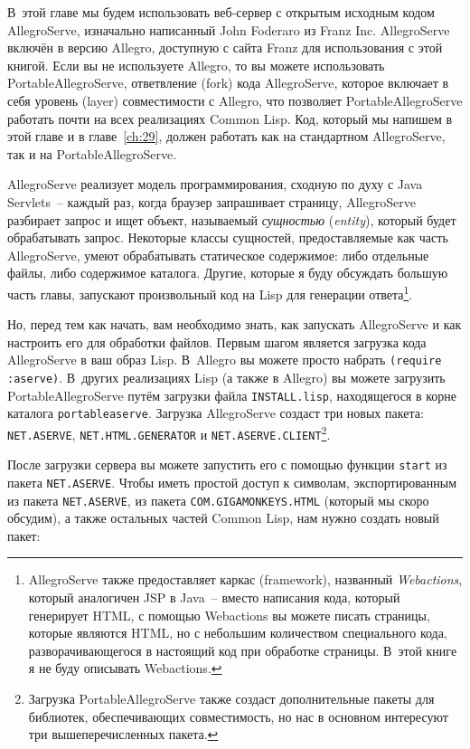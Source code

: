 В~этой главе мы будем использовать веб-сервер с открытым исходным кодом AllegroServe,
изначально написанный John Foderaro из Franz Inc. AllegroServe включён в версию Allegro,
доступную с сайта Franz для использования с этой книгой. Если вы не используете Allegro,
то вы можете использовать PortableAllegroServe, ответвление (fork) кода AllegroServe,
которое включает в себя уровень (layer) совместимости с Allegro, что позволяет
PortableAllegroServe работать почти на всех реализациях Common Lisp. Код, который мы
напишем в этой главе и в главе~\ref{ch:29}, должен работать как на стандартном
AllegroServe, так и на PortableAllegroServe.

AllegroServe реализует модель программирования, сходную по духу с Java Servlets~-- каждый
раз, когда браузер запрашивает страницу, AllegroServe разбирает запрос и ищет объект,
называемый \textit{сущностью} (\textit{entity}), который будет обрабатывать
запрос. Некоторые классы сущностей, предоставляемые как часть AllegroServe, умеют
обрабатывать статическое содержимое: либо отдельные файлы, либо содержимое
каталога. Другие, которые я буду обсуждать большую часть главы, запускают произвольный код
на Lisp для генерации ответа\footnote{AllegroServe также предоставляет каркас
  (framework), названный \textit{Webactions}, который аналогичен JSP в Java~-- вместо
  написания кода, который генерирует HTML, с помощью Webactions вы можете писать страницы,
  которые являются HTML, но с небольшим количеством специального кода, разворачивающегося
  в настоящий код при обработке страницы. В~этой книге я не буду описывать Webactions.}.

Но, перед тем как начать, вам необходимо знать, как запускать AllegroServe и как настроить
его для обработки файлов. Первым шагом является загрузка кода AllegroServe в ваш образ
Lisp. В~Allegro вы можете просто набрать \lstinline{(require :aserve)}. В~других реа\-ли\-за\-циях
Lisp (а также в Allegro) вы можете загрузить PortableAllegroServe путём загрузки файла
\lstinline{INSTALL.lisp}, находящегося в корне каталога \lstinline{portableaserve}. Загрузка
AllegroServe создаст три новых пакета: \lstinline{NET.ASERVE}, \lstinline{NET.HTML.GENERATOR} и
\lstinline{NET.ASERVE.CLIENT}\footnote{Загрузка PortableAllegroServe также создаст
  дополнительные пакеты для библиотек, обес\-пе\-чи\-ваю\-щих совместимость, но нас в основном
  интересуют три вышеперечисленных пакета.}.

После загрузки сервера вы можете запустить его с помощью функции \lstinline{start} из пакета
\lstinline{NET.ASERVE}. Чтобы иметь простой доступ к символам, экспортированным из пакета
\lstinline{NET.ASERVE}, из пакета \lstinline{COM.GIGAMONKEYS.HTML} (который мы скоро обсудим), а
также остальных частей Common Lisp, нам нужно создать новый пакет:

